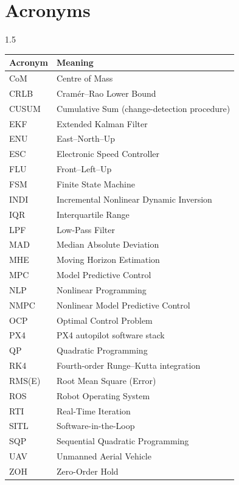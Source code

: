 \chapter*{\centering Acronyms}

\begin{spacing}{1.5}
\setlength{\parskip}{0.1in}
\begin{table}[ht]
\centering
\small
\begin{tabular}{@{}ll@{}}
\toprule
\textbf{Acronym} & \textbf{Meaning} \\
\midrule
CoM & Centre of Mass \\
CRLB & Cram\'er--Rao Lower Bound \\
CUSUM & Cumulative Sum (change-detection procedure) \\
EKF & Extended Kalman Filter \\
ENU & East--North--Up \\
ESC & Electronic Speed Controller \\
FLU & Front--Left--Up \\
FSM & Finite State Machine \\
INDI & Incremental Nonlinear Dynamic Inversion \\
IQR & Interquartile Range \\
LPF & Low-Pass Filter \\
MAD & Median Absolute Deviation \\
MHE & Moving Horizon Estimation \\
MPC & Model Predictive Control \\
NLP & Nonlinear Programming \\
NMPC & Nonlinear Model Predictive Control \\
OCP & Optimal Control Problem \\
PX4 & PX4 autopilot software stack \\
QP & Quadratic Programming \\
RK4 & Fourth-order Runge--Kutta integration \\
RMS(E) & Root Mean Square (Error) \\
ROS & Robot Operating System \\
RTI & Real-Time Iteration \\
SITL & Software-in-the-Loop \\
SQP & Sequential Quadratic Programming \\
UAV & Unmanned Aerial Vehicle \\
ZOH & Zero-Order Hold \\
\bottomrule
\end{tabular}
\end{table}
\end{spacing}
\newpage
